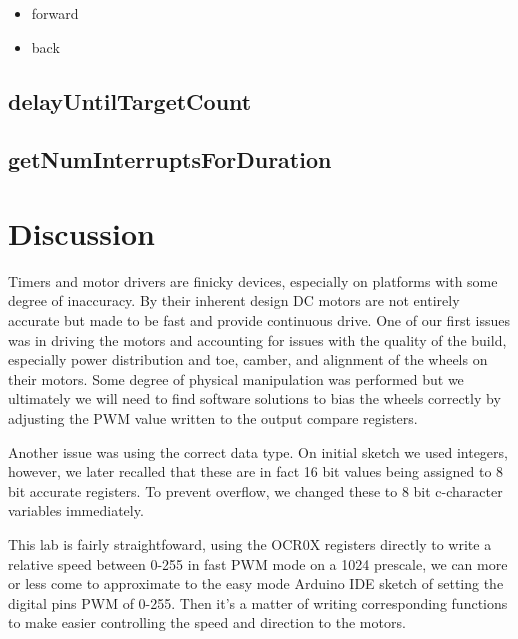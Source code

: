 \documentclass[letterpaper,11pt]{texMemo} %
\begin{document}
\begin{itemize}
    \item forward
    \item back
\end{itemize}

\subsection*{delayUntilTargetCount}

\subsection*{getNumInterruptsForDuration}

\section*{Discussion}
Timers and motor drivers are finicky devices, especially on platforms with 
some degree of inaccuracy. By their inherent design DC motors are not entirely 
accurate but made to be fast and provide continuous drive. One of our first 
issues was in driving the motors and accounting for issues with the quality 
of the build, especially power distribution and toe, camber, and alignment of 
the wheels on their motors. Some degree of physical manipulation was performed 
but we ultimately we will need to find software solutions to bias the wheels correctly by 
adjusting the PWM value written to the output compare registers.

Another issue was using the correct data type. On initial sketch we used integers, 
however, we later recalled that these are in fact 16 bit values being assigned to 
8 bit accurate registers. To prevent overflow, we changed these to 8 bit c-character 
variables immediately.

This lab is fairly straightfoward, using the OCR0X registers directly to write a 
relative speed between 0-255 in fast PWM mode on a 1024 prescale, we can more or 
less come to approximate to the easy mode Arduino IDE sketch of setting the digital 
pins PWM of 0-255. Then it's a matter of writing corresponding functions to 
make easier controlling the speed and direction to the motors.
\end{document}
